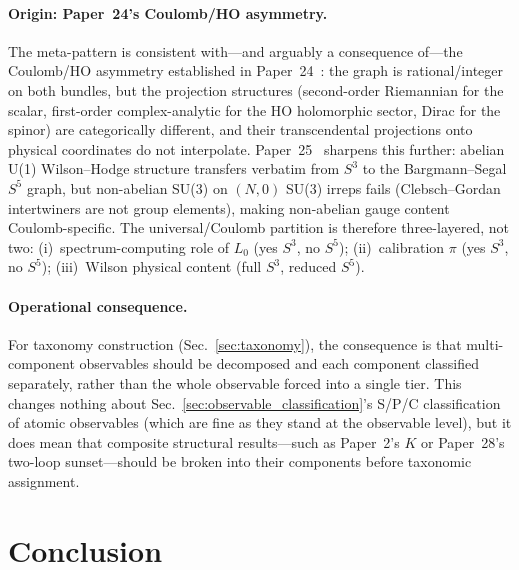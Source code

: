 \documentclass[aps,pra,twocolumn,superscriptaddress,longbibliography]{revtex4-2}
\begin{document}
\paragraph{Origin: Paper~24's Coulomb/HO asymmetry.}
The meta-pattern is consistent with---and arguably a consequence
of---the Coulomb/HO asymmetry established in
Paper~24~\cite{loutey_paper24}: the graph is rational/integer on
both bundles, but the projection structures (second-order Riemannian
for the scalar, first-order complex-analytic for the HO holomorphic
sector, Dirac for the spinor) are categorically different, and
their transcendental projections onto physical coordinates do not
interpolate.  Paper~25~\cite{loutey_paper25} sharpens this further:
abelian U(1) Wilson--Hodge structure transfers verbatim from $S^3$
to the Bargmann--Segal $S^5$ graph, but non-abelian SU(3) on $(N,0)$
SU(3) irreps fails (Clebsch--Gordan intertwiners are not group
elements), making non-abelian gauge content Coulomb-specific.  The
universal/Coulomb partition is therefore three-layered, not two:
(i)~spectrum-computing role of $L_0$ (yes $S^3$, no $S^5$);
(ii)~calibration $\pi$ (yes $S^3$, no $S^5$);
(iii)~Wilson physical content (full $S^3$, reduced $S^5$).

\paragraph{Operational consequence.}  For taxonomy construction
(Sec.~\ref{sec:taxonomy}), the consequence is that multi-component
observables should be decomposed and each component classified
separately, rather than the whole observable forced into a single
tier.  This changes nothing about
Sec.~\ref{sec:observable_classification}'s S/P/C classification of
atomic observables (which are fine as they stand at the observable
level), but it does mean that composite structural results---such as
Paper~2's $K$ or Paper~28's two-loop sunset---should be broken into
their components before taxonomic assignment.



\section{Conclusion}
\label{sec:conclusion}
\end{document}
